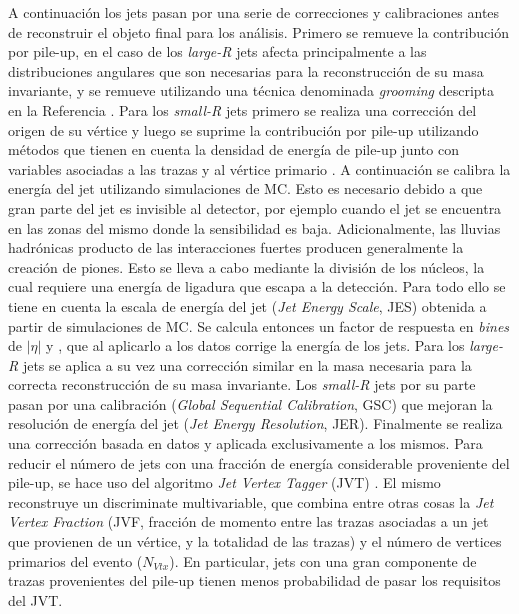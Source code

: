 A continuación los jets pasan por una serie de correcciones y calibraciones antes de reconstruir el objeto final para los análisis. Primero se remueve la contribución por pile-up, en el caso de los \textit{large-R} jets afecta principalmente a las distribuciones angulares que son necesarias para la reconstrucción de su masa invariante, y se remueve utilizando una técnica denominada \textit{grooming} descripta en la Referencia \cite{Krohn_2010}. Para los \textit{small-R} jets primero se realiza una corrección del origen de su vértice y luego se suprime la contribución por pile-up utilizando métodos que tienen en cuenta la densidad de energía de pile-up \cite{PERF-2016-04} junto con variables asociadas a las trazas y al vértice primario \cite{PERF-2014-03}.
A continuación se calibra la energía del jet utilizando simulaciones de MC.
Esto es necesario debido a que gran parte del jet es invisible al detector, por ejemplo cuando el jet se encuentra en las zonas del mismo donde la sensibilidad es baja. 
Adicionalmente, las lluvias hadrónicas producto de las interacciones fuertes producen generalmente la creación de piones. Esto se lleva a cabo mediante la división de los núcleos, la cual requiere una energía de ligadura que escapa a la detección. Para todo ello se tiene en cuenta
la escala de energía del jet (\textit{Jet Energy Scale}, JES) \cite{JETM-2018-05} obtenida a partir de simulaciones de MC. Se calcula entonces un factor de respuesta en \textit{bines} de $|\eta|$ y \pt, que al aplicarlo a los datos corrige la energía de los jets. Para los \textit{large-R} jets se aplica a su vez una corrección similar en la masa necesaria para la correcta reconstrucción de su masa invariante. Los \textit{small-R} jets por su parte pasan por una calibración (\textit{Global Sequential Calibration}, GSC) que mejoran la resolución de energía del jet (\textit{Jet Energy Resolution}, JER). Finalmente se realiza una corrección basada en datos y aplicada exclusivamente a los mismos.
Para reducir el número de jets con una fracción de energía considerable proveniente del pile-up, se hace uso del algoritmo \textit{Jet Vertex Tagger} (JVT) \cite{ATLAS-CONF-2014-018}. El mismo reconstruye un discriminate multivariable, que combina entre otras cosas la \textit{Jet Vertex Fraction} (JVF, fracción de momento entre las trazas asociadas a un jet que provienen de un vértice, y la totalidad de las trazas) y el número de vertices primarios del evento ($N_{Vtx}$). En particular, jets con una gran componente de trazas provenientes del pile-up tienen menos probabilidad de pasar los requisitos del JVT. 





